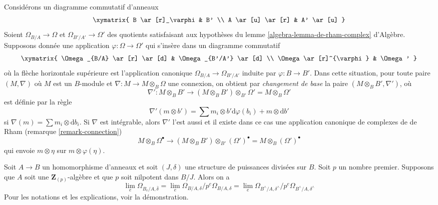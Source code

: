 \begin{remark}
\label{remark-base-change-connection}
Considérons un diagramme commutatif d'anneaux
$$
\xymatrix{
B \ar[r]_\varphi & B' \\
A \ar[u] \ar[r] & A' \ar[u]
}
$$
Soient $\Omega_{B/A} \to \Omega$ et $\Omega_{B'/A'} \to \Omega'$
des quotients satisfaisant aux hypothèses du
lemme \ref{algebra-lemma-de-rham-complex} d'Algèbre.
Supposons donnée une application $\varphi : \Omega \to \Omega'$ qui
s'insère dans un diagramme commutatif
$$
\xymatrix{
\Omega_{B/A} \ar[r] \ar[d] &
\Omega_{B'/A'} \ar[d] \\
\Omega \ar[r]^{\varphi} &
\Omega'
}
$$
où la flèche horizontale supérieure est l'application canonique
$\Omega_{B/A} \to \Omega_{B'/A'}$ induite par $\varphi : B \to B'$.
Dans cette situation, pour toute paire $(M, \nabla)$ où $M$ est un $B$-module
et $\nabla : M \to M \otimes_B \Omega$ une connexion,
on obtient par {\it changement de base} la paire $(M \otimes_B B', \nabla')$, où
$$
\nabla' :
M \otimes_B B'
\longrightarrow
(M \otimes_B B') \otimes_{B'} \Omega' = M \otimes_B \Omega'
$$
est définie par la règle
$$
\nabla'(m \otimes b') =
\sum m_i \otimes b'\text{d}\varphi(b_i) + m \otimes \text{d}b' 
$$
si $\nabla(m) = \sum m_i \otimes \text{d}b_i$. Si $\nabla$ est intégrable,
alors $\nabla'$ l'est aussi et il existe dans ce cas une application canonique de
complexes de de Rham (remarque \ref{remark-connection})
\begin{equation}
\label{equation-base-change-map-complexes}
M \otimes_B \Omega^\bullet
\longrightarrow
(M \otimes_B B') \otimes_{B'} (\Omega')^\bullet =
M \otimes_B (\Omega')^\bullet
\end{equation}
qui envoie $m \otimes \eta$ sur $m \otimes \varphi(\eta)$.
\end{remark}

\begin{lemma}
\label{lemma-differentials-completion}
Soit $A \to B$ un homomorphisme d'anneaux et soit $(J, \delta)$ une structure de
puissances divisées sur $B$. Soit $p$ un nombre premier. Supposons que $A$ soit une
$\mathbf{Z}_{(p)}$-algèbre et que $p$ soit nilpotent dans $B/J$. Alors
on a
$$
\lim_e \Omega_{B_e/A, \bar\delta} =
\lim_e \Omega_{B/A, \delta}/p^e\Omega_{B/A, \delta} =
\lim_e \Omega_{B^\wedge/A, \delta^\wedge}/p^e \Omega_{B^\wedge/A, \delta^\wedge}
$$
Pour les notations et les explications, voir la démonstration.
\end{lemma}

